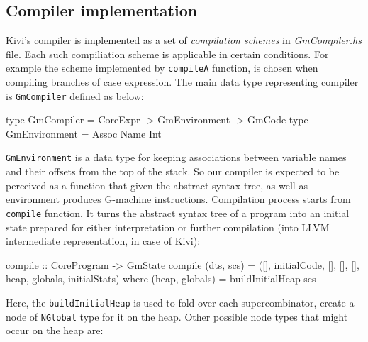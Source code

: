 \documentclass[12pt,a4paper]{report}
\begin{document}

%
%

\subsection{Compiler implementation}
Kivi's compiler is implemented as a set of \textit{compilation schemes} in
\textit{GmCompiler.hs} file. Each such compiliation scheme is applicable in
certain conditions. For example the scheme implemented by \texttt{compileA}
function, is chosen when compiling branches of case expression. The main data
type representing compiler is \texttt{GmCompiler} defined as below:

\vspace*{0.2in}
\begin{code}[style=haskell]
  type GmCompiler = CoreExpr -> GmEnvironment -> GmCode
  type GmEnvironment = Assoc Name Int
\end{code}

\texttt{GmEnvironment} is a data type for keeping associations between variable
names and their offsets from the top of the stack. So our compiler is expected
to be perceived as a function that given the abstract syntax tree, as well as
environment produces G-machine instructions. Compilation process starts from
\texttt{compile} function. It turns the abstract syntax tree of a program into
an initial state prepared for either interpretation or further compilation
(into LLVM intermediate representation, in case of Kivi):

\vspace*{0.2in}
\begin{code}[style=haskell]
  compile :: CoreProgram -> GmState
  compile (dts, scs) = ([], initialCode, [], [], [], heap, globals, initialStats)
      where
          (heap, globals) = buildInitialHeap scs
\end{code}

Here, the \texttt{buildInitialHeap} is used to fold over each supercombinator,
create a node of \texttt{NGlobal} type for it on the heap. Other possible node
types that might occur on the heap are:
\end{document}
